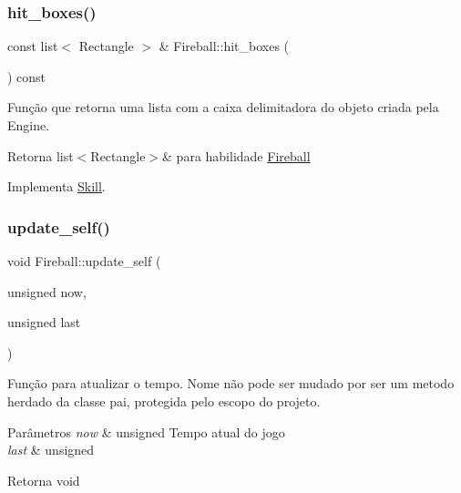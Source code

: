 \subsubsection{\texorpdfstring{hit\+\_\+boxes()}{hit\_boxes()}}
{\footnotesize\ttfamily const list$<$ Rectangle $>$ \& Fireball\+::hit\+\_\+boxes (\begin{DoxyParamCaption}{ }\end{DoxyParamCaption}) const\hspace{0.3cm}{\ttfamily [virtual]}}



Função que retorna uma lista com a caixa delimitadora do objeto criada pela Engine. 

\begin{DoxyReturn}{Retorna}
list$<$\+Rectangle$>$\& para habilidade \mbox{\hyperlink{classFireball}{Fireball}} 
\end{DoxyReturn}


Implementa \mbox{\hyperlink{classSkill}{Skill}}.

\mbox{\label{classFireball_a73c9722b10f4d811031f270184265c4d}} 
\subsubsection{\texorpdfstring{update\+\_\+self()}{update\_self()}}
{\footnotesize\ttfamily void Fireball\+::update\+\_\+self (\begin{DoxyParamCaption}\item[{unsigned}]{now,  }\item[{unsigned}]{last }\end{DoxyParamCaption})\hspace{0.3cm}{\ttfamily [protected]}}



Função para atualizar o tempo. Nome não pode ser mudado por ser um metodo herdado da classe pai, protegida pelo escopo do projeto. 


\begin{DoxyParams}{Parâmetros}
{\em now} & unsigned Tempo atual do jogo \\
\hline
{\em last} & unsigned \\
\hline
\end{DoxyParams}
\begin{DoxyReturn}{Retorna}
void 
\end{DoxyReturn}
\mbox{\label{classFireball_a991b36830d1e36863ebca52dea50f9c3}} 
